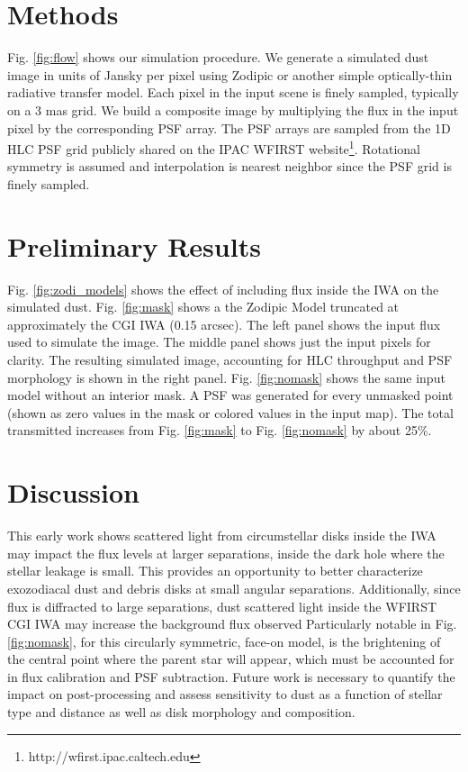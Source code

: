 \documentclass[]{spie}  %
\begin{document}
\section{Methods}
\label{sec:intro}  %
Fig. \ref{fig:flow} shows our simulation procedure. 
We generate a simulated dust image in units of Jansky per pixel using Zodipic\cite{kuchner_zodipic_2012} or another simple optically-thin radiative transfer model.
Each pixel in the input scene is finely sampled, typically on a 3 mas grid.  
We build a composite image by multiplying the flux in the input pixel by the corresponding PSF array.
The PSF arrays are sampled from the 1D \gls{HLC} \gls{PSF} grid publicly shared on the IPAC WFIRST  website\footnote{http://wfirst.ipac.caltech.edu}.
Rotational symmetry is assumed and interpolation is  nearest neighbor since the \gls{PSF} grid is finely sampled.

\section{Preliminary Results}

    Fig. \ref{fig:zodi_models} shows the effect of including flux inside the \gls{IWA} on the simulated dust.
    Fig. \ref{fig:mask} shows a the Zodipic Model truncated at approximately the \gls{CGI} \gls{IWA} (0.15 arcsec). The left panel shows the input flux used to simulate the image. The middle panel shows just the input pixels for clarity. 
    The resulting simulated image, accounting for \gls{HLC} throughput and \gls{PSF} morphology is shown in the right panel.
    Fig. \ref{fig:nomask} shows the same input model without an interior mask.
    A \gls{PSF} was generated for every unmasked point (shown as zero values in the mask or colored values in the input map).    The  total transmitted increases from Fig. \ref{fig:mask} to Fig. \ref{fig:nomask} by about 25\%.
    
    \section{Discussion}
    This early work shows scattered light from circumstellar disks inside the \gls{IWA} may impact the flux levels at larger separations, inside the dark hole where the stellar leakage is small.
    This provides an opportunity to better characterize exozodiacal dust and debris disks at small angular separations.
    Additionally, since flux is diffracted to large separations, dust scattered light inside the \gls{WFIRST} CGI \gls{IWA} may increase the background flux observed
    Particularly notable in Fig. \ref{fig:nomask}, for this circularly symmetric, face-on model,  is the brightening of the central point where the parent star will appear, which must be accounted for in flux calibration and \gls{PSF} subtraction.
    Future work is necessary to quantify the impact on post-processing and assess sensitivity to dust as a function of stellar type and distance as well as disk morphology and composition.
    
\end{document}
